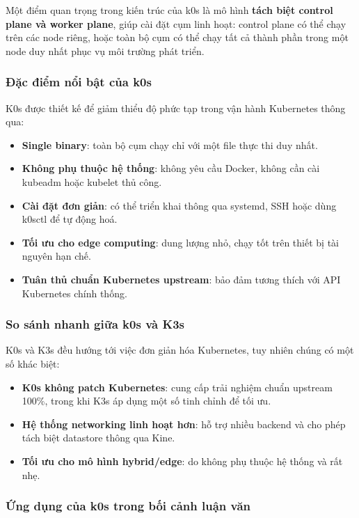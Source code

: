 Một điểm quan trọng trong kiến trúc của k0s là mô hình \textbf{tách biệt control plane và worker plane}, 
giúp cài đặt cụm linh hoạt: control plane có thể chạy trên các node riêng, hoặc toàn bộ cụm có thể chạy 
tất cả thành phần trong một node duy nhất phục vụ môi trường phát triển.

\subsubsection*{Đặc điểm nổi bật của k0s}

K0s được thiết kế để giảm thiểu độ phức tạp trong vận hành Kubernetes thông qua:

\begin{itemize}
    \item \textbf{Single binary}: toàn bộ cụm chạy chỉ với một file thực thi duy nhất.
    \item \textbf{Không phụ thuộc hệ thống}: không yêu cầu Docker, không cần cài kubeadm hoặc kubelet thủ công.
    \item \textbf{Cài đặt đơn giản}: có thể triển khai thông qua systemd, SSH hoặc dùng k0sctl để tự động hoá.
    \item \textbf{Tối ưu cho edge computing}: dung lượng nhỏ, chạy tốt trên thiết bị tài nguyên hạn chế.
    \item \textbf{Tuân thủ chuẩn Kubernetes upstream}: bảo đảm tương thích với API Kubernetes chính thống.
\end{itemize}

\subsubsection*{So sánh nhanh giữa k0s và K3s}

K0s và K3s đều hướng tới việc đơn giản hóa Kubernetes, tuy nhiên chúng có một số khác biệt:

\begin{itemize}
    \item \textbf{K0s không patch Kubernetes}: cung cấp trải nghiệm chuẩn upstream 100\%,
    trong khi K3s áp dụng một số tinh chỉnh để tối ưu.
    \item \textbf{Hệ thống networking linh hoạt hơn}: hỗ trợ nhiều backend và cho phép 
    tách biệt datastore thông qua Kine.
    \item \textbf{Tối ưu cho mô hình hybrid/edge}: do không phụ thuộc hệ thống và rất nhẹ.
\end{itemize}

\subsubsection*{Ứng dụng của k0s trong bối cảnh luận văn}


